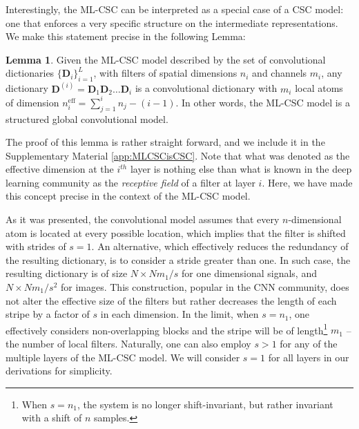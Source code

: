 \documentclass[10pt,journal]{IEEEtran}
\def\x{{\mathbf x}}
\def\D{{\mathbf D}}
\def\PP{{\mathbf P}}
\def\SS{{\mathbf S}}
\def\gama{{\boldsymbol \gamma}}
\def\pp{{\scriptscriptstyle{\PP}}}
\def\ss{{\scriptscriptstyle{\SS}}}
\theoremstyle{plain}
\theoremstyle{definition}
\newtheorem{lemma}{Lemma}
\begin{document}
Interestingly, the ML-CSC can be interpreted as a special case of a CSC model: one that enforces a very specific structure on the intermediate representations. We make this statement precise in the following Lemma:

\begin{lemma}{} \label{lemma:MLCSCisCSC}
	Given the ML-CSC model described by the set of convolutional dictionaries $\{\D_i\}_{i=1}^L$, with filters of spatial dimensions $n_i$ and channels $m_i$, any dictionary $\D^{(i)} = \D_1 \D_2 \dots \D_i$ is a convolutional dictionary with $m_i$ local atoms of dimension $n_i^{\text{eff}} = \sum_{j=1}^{i} n_j - (i-1)$. In other words, the ML-CSC model is a structured global convolutional model.
\end{lemma}
\noindent
The proof of this lemma is rather straight forward, and we include it in the Supplementary Material \ref{app:MLCSCisCSC}.
Note that what was denoted as the effective dimension at the $i^{th}$ layer is nothing else than what is known in the deep learning community as the \emph{receptive field} of a filter at layer $i$. Here, we have made this concept precise in the context of the ML-CSC model.

As it was presented, the convolutional model assumes that every $n$-dimensional atom is located at every possible location, which implies that the filter is shifted with strides of $s=1$. An alternative, which effectively reduces the redundancy of the resulting dictionary, is to consider a stride greater than one. In such case, the resulting dictionary is of size $N\times Nm_1/s$ for one dimensional signals, and $N\times N m_1 / s^2$ for images. This construction, popular in the CNN community, does not alter the effective size of the filters but rather decreases the length of each stripe by a factor of $s$ in each dimension. In the limit, when $s = n_1$, one effectively considers non-overlapping blocks and the stripe will be of length\footnote{When $s=n_1$, the system is no longer shift-invariant, but rather invariant with a shift of $n$ samples.} $m_1$ -- the number of local filters. Naturally, one can also employ $s>1$ for any of the multiple layers of the ML-CSC model. We will consider $s=1$ for all layers in our derivations for simplicity.
\end{document}
